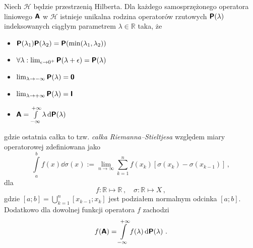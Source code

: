 \documentclass{myclass}
\begin{document}
\linesep

\begin{textbox}
\begin{theorem}
Niech \(\mathscr{H}\) będzie przestrzenią Hilberta. Dla każdego samosprzężonego operatora liniowego
\(\boldsymbol{\mathsf{A}}\) w \(\mathscr{H}\) istnieje unikalna rodzina operatorów rzutowych \(\boldsymbol{\mathsf{P}}(\lambda)\)
indeksowanych ciągłym parametrem \(\lambda \in \mathbb{R}\) taka, że
\begin{itemize}
    
    \item \(\boldsymbol{\mathsf{P}}(\lambda_1)\boldsymbol{\mathsf{P}}(\lambda_2) = \boldsymbol{\mathsf{P}}(\min(\lambda_1,\lambda_2))\)

    \item \(\forall \lambda: \lim_{\epsilon\to0^+}\boldsymbol{\mathsf{P}}(\lambda+\epsilon) = \boldsymbol{\mathsf{P}}(\lambda)\)
    
    \item \(\lim_{\lambda\to-\infty}\boldsymbol{\mathsf{P}}(\lambda) = \boldsymbol{\mathsf{0}}\)

    \item \(\lim_{\lambda\to+\infty}\boldsymbol{\mathsf{P}}(\lambda) = \boldsymbol{\mathsf{I}}\)

    \item \(\boldsymbol{\mathsf{A}} = \int\limits_{-\infty}^{+\infty}\lambda \dd{\boldsymbol{\mathsf{P}}(\lambda)}\)

\end{itemize}
gdzie ostatnia całka to tzw. \textit{całka Riemanna--Stieltjesa} względem miary operatorowej
zdefiniowana jako
\begin{equation*}
        \int\limits_a^b f(x) \dd{\sigma(x)} := \lim_{n\to\infty}\sum_{k=1}^nf(x_k)\left[\sigma(x_k) - \sigma(x_{k-1})\right]\,,
\end{equation*}
dla 
\begin{equation*}
    f: \mathbb{R} \mapsto \mathbb{R}\,,\quad \sigma: \mathbb{R} \mapsto X\,,
\end{equation*}
gdzie \([a;b] = \bigcup_{k=1}^{n}[x_{k-1}; x_k]\) jest podziałem normalnym odcinka \([a;b]\).
Dodatkowo dla dowolnej funkcji operatora \(f\) zachodzi
\begin{equation*}
    f(\boldsymbol{\mathsf{A}}) = \int\limits_{-\infty}^{+\infty} f(\lambda) \dd{\boldsymbol{\mathsf{P}}(\lambda)}\,.
\end{equation*}
\end{theorem}        
\end{textbox}
\end{document}
